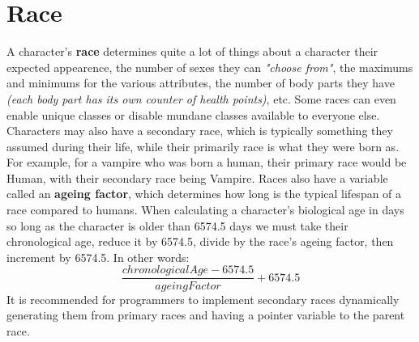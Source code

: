 \documentclass[openany,11pt,a4paper]{book}
\begin{document}
\section{Race}
A character's \textbf{race} determines quite a lot of things about a character \textemdash their expected appearence, the number of sexes they can \textit{"choose from"}, the maximums and minimums for the various attributes, the number of body parts they have \textit{(each body part has its own counter of health points)}, etc. Some races can even enable unique classes or disable mundane classes available to everyone else.\newline
Characters may also have a secondary race, which is typically something they assumed during their life, while their primarily race is what they were born as. For example, for a vampire who was born a human, their primary race would be Human, with their secondary race being Vampire.\newline
Races also have a variable called an \textbf{ageing factor}, which determines how long is the typical lifespan of a race compared to humans. When calculating a character's biological age in days \textemdash so long as the character is older than 6574.5 days \textemdash we must take their chronological age, reduce it by 6574.5, divide by the race's ageing factor, then increment by 6574.5. In other words: \[\frac{chronologicalAge-6574.5}{ageingFactor}+6574.5\]
It is recommended for programmers to implement secondary races dynamically generating them from primary races and having a pointer variable to the parent race. 
\end{document}

